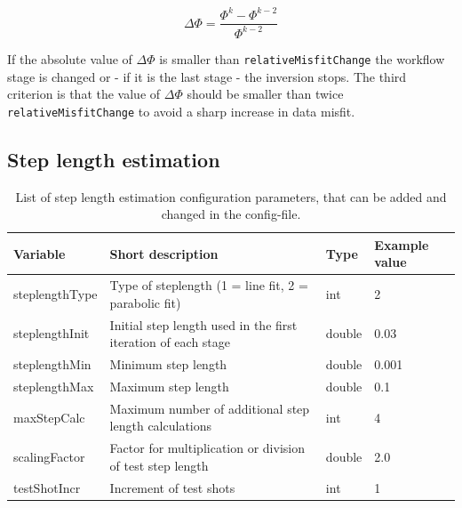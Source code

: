\documentclass[pdftex,a4paper,parskip,listof=totoc,bibliography=totoc,onehalfspacing,12pt]{scrreprt}
\begin{document}
\begin{equation*}
 \Delta \Phi = \frac{\Phi^k-\Phi^{k-2}}{\Phi^{k-2}}
\end{equation*}

If the absolute value of $\Delta \Phi$ is smaller than \verb+relativeMisfitChange+ the workflow stage is changed or - if it is the last stage - the inversion stops. The third criterion is that the value of $\Delta \Phi$ should be smaller than twice \verb+relativeMisfitChange+ to avoid a sharp increase in data misfit.

\subsection{Step length estimation}
\begin{table}[h!]
\caption[List of step length estimation configuration parameters.]{List of step length estimation configuration parameters, that can be added and changed in the config-file.}\label{tab:config_steplength}
\centering
\begin{adjustbox}{width=1\textwidth,center=\textwidth}
	\begin{tabular}{llll}
	\toprule
         Variable                 & Short description                                                   & Type   & Example value \\
	\midrule
         steplengthType           & Type of steplength (1 = line fit, 2 = parabolic fit)      & int & 2  \\
         steplengthInit           & Initial step length used in the first iteration of each stage       & double & 0.03  \\
         steplengthMin            & Minimum step length                                                 & double & 0.001 \\
         steplengthMax            & Maximum step length                                                 & double & 0.1 \\                     
         maxStepCalc              & Maximum number of additional step length calculations               &  int   & 4 \\                         
         scalingFactor            & Factor for multiplication or division of test step length           & double & 2.0 \\                                            
         testShotIncr             & Increment of test shots                                             &  int   & 1 \\                       
	\bottomrule
	\end{tabular}
	\end{adjustbox}
\end{table}
\end{document}
